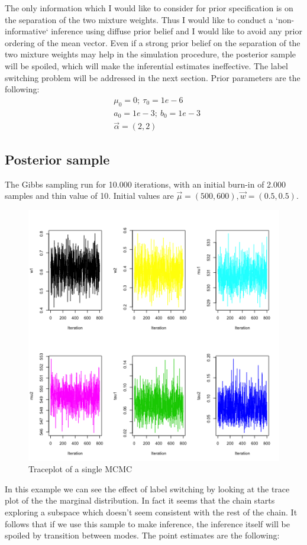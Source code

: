 \documentclass{article}
\begin{document}
The only information which I would like to consider for prior specification is on the separation of the two mixture weights. Thus I would like to conduct a `non-informative` inference using diffuse prior belief and I would like to avoid any prior ordering of the mean vector. Even if a strong prior belief on the separation of the two mixture weights may help in the simulation procedure, the posterior sample will be spoiled, which will make the inferential estimates ineffective. The label switching problem will be addressed in the next section. 
Prior parameters are the following:
\begin{align*}
& \mu_0 = 0; \ \tau_0 = 1e-6 \\
& a_0 = 1e-3;\  b_0 = 1e-3 \\
& \vec \alpha = (2,2)
\end{align*}

\subsection{Posterior sample}
The Gibbs sampling run for 10.000 iterations, with an initial burn-in of 2.000 samples and thin value of 10. Initial values are $\vec \mu = (500, 600), \vec w = (0.5,0.5)$. 

\begin{figure}[h!]
    \centering
    \includegraphics[width=.7\textwidth]{plot_3.png}
    \caption{Traceplot of a single MCMC}
    \label{Monkey measurement}
\end{figure}

In this example we can see the effect of label switching by looking at the trace plot of the the marginal distribution. In fact it seems that the chain starts exploring a subspace which doesn't seem consistent with the rest of the chain. It follows that if we use this sample to make inference, the inference itself will be spoiled by transition between modes. The point estimates are the following:
\end{document}
